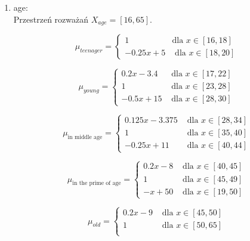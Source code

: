 \documentclass{classrep}
\begin{document}
\begin{enumerate}
  \item age:\\
  Przestrzeń rozważań $X_{age} = [16,65]$. 

      \begin{equation}
        \mu_{teenager} =
          \begin{cases}
            1 & \text{dla } x \in [16,18] \\
            -0.25x +5 & \text{ dla } x \in [18,20]
          \end{cases}  
      \end{equation}

      \begin{equation}
        \mu_{young} =
        \begin{cases}
            0.2x-3.4 & \text{ dla } x \in [17,22]  \\
            1 & \text{ dla } x \in [23,28] \\
            -0.5x + 15 & \text{ dla } x \in [28,30]
          \end{cases}
      \end{equation}

      \begin{equation}
        \mu_{\text{in middle age}} =
                \begin{cases}
            0.125x-3.375 & \text{ dla } x \in [28,34]  \\
            1 & \text{ dla } x \in [35,40] \\
            -0.25x + 11 & \text{ dla } x \in [40,44]
          \end{cases}
      \end{equation} 

      \begin{equation}
        \mu_{\text{in the prime of age}} =
        \begin{cases}
            0.2x-8 & \text{ dla } x \in [40,45]  \\
            1 & \text{ dla } x \in [45,49] \\
            -x + 50 & \text{ dla } x \in [19,50]
          \end{cases}
      \end{equation} 

      \begin{equation}
        \mu_{old} =
        \begin{cases}
            0.2x-9 & \text{ dla } x \in [45,50]  \\
            1 & \text{ dla } x \in [50,65] \\
          \end{cases}
      \end{equation} 


\end{enumerate}
\end{document}
